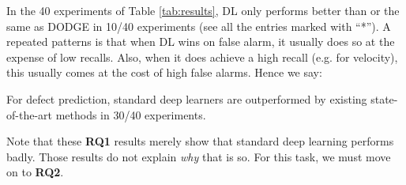 \documentclass[10pt,compsoc,twocolumn]{IEEEtran}
\newcommand{\BLUE}{\color{blue}}
\newcommand{\BLACK}{\color{black}}
\begin{document}
 
In the 40 experiments of   Table \ref{tab:results}, DL only  performs  better than or the same as
DODGE in  10/40 experiments (see all the entries marked with ``*''). 
 A repeated patterns is that when DL wins on false alarm, it usually does so at the expense
 of low recalls.  Also,   when it does achieve a high recall (e.g. for velocity),
 this usually comes at the cost 
 of  high false alarms.
Hence we say:


\begin{blockquote}
    \noindent
    \BLUE
    For defect prediction, standard deep learners  are outperformed by existing state-of-the-art methods in 30/40 experiments. \BLACK
\end{blockquote}

 Note that these {\bf RQ1} results merely show that standard deep learning performs badly.
 Those results do not explain {\em why} that is so. For this task,
 we must move on to {\bf RQ2}.
\end{document}

